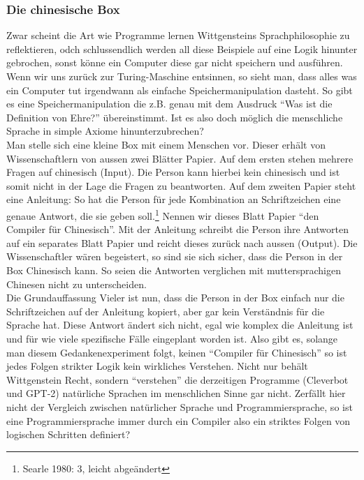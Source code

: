 \documentclass[a4paper,10pt]{article}
\begin{document}
\subsubsection{Die chinesische Box}
Zwar scheint die Art wie Programme lernen Wittgensteins Sprachphilosophie zu reflektieren, odch schlussendlich werden all diese Beispiele auf eine Logik hinunter gebrochen, sonst könne ein Computer diese gar nicht speichern und ausführen. Wenn wir uns zurück zur Turing-Maschine entsinnen, so sieht man, dass alles was ein Computer tut irgendwann als einfache Speichermanipulation dasteht. So gibt es eine Speichermanipulation die z.B. genau mit dem Ausdruck \enquote{Was ist die Definition von Ehre?} übereinstimmt. Ist es also doch möglich die menschliche Sprache in simple Axiome hinunterzubrechen? \\
Man stelle sich eine kleine Box mit einem Menschen vor. Dieser erhält von Wissenschaftlern von aussen zwei Blätter Papier. Auf dem ersten stehen mehrere Fragen auf chinesisch (Input). Die Person kann hierbei kein chinesisch und ist somit nicht in der Lage die Fragen zu beantworten. Auf dem zweiten Papier steht eine Anleitung: So hat die Person für jede Kombination an Schriftzeichen eine genaue Antwort, die sie geben soll.\footnote{Searle 1980: 3, leicht abgeändert} Nennen wir dieses Blatt Papier \enquote{den Compiler für Chinesisch}. Mit der Anleitung schreibt die Person ihre Antworten auf ein separates Blatt Papier und reicht dieses zurück nach aussen (Output). Die Wissenschaftler wären begeistert, so sind sie sich sicher, dass die Person in der Box Chinesisch kann. So seien die Antworten verglichen mit muttersprachigen Chinesen nicht zu unterscheiden. \\
Die Grundauffassung Vieler ist nun, dass die Person in der Box einfach nur die Schriftzeichen auf der Anleitung kopiert, aber gar kein Verständnis für die Sprache hat. Diese Antwort ändert sich nicht, egal wie komplex die Anleitung ist und für wie viele spezifische Fälle eingeplant worden ist. Also gibt es, solange man diesem Gedankenexperiment folgt, keinen \enquote{Compiler für Chinesisch} so ist jedes Folgen strikter Logik kein wirkliches Verstehen. Nicht nur behält Wittgenstein Recht, sondern \enquote{verstehen} die derzeitigen Programme (Cleverbot und GPT-2) natürliche Sprachen im menschlichen Sinne gar nicht. Zerfällt hier nicht der Vergleich zwischen natürlicher Sprache und Programmiersprache, so ist eine Programmiersprache immer durch ein Compiler also ein striktes Folgen von logischen Schritten definiert?
\end{document}
